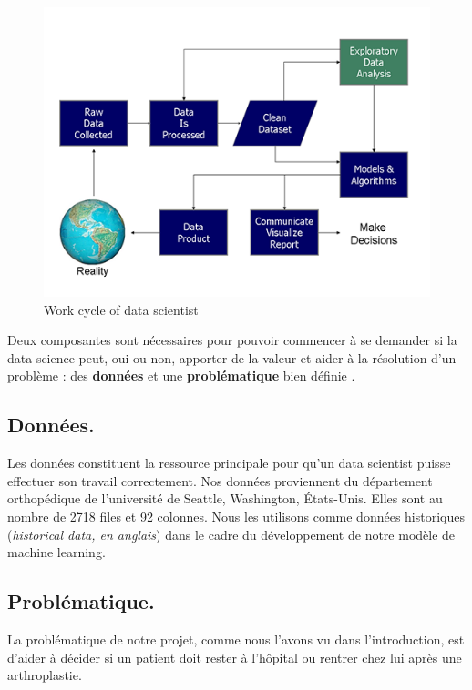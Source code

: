 \documentclass[12pt, french]{report}
\begin{document}
\begin{figure}[h]
\includegraphics[]{images/workflow_datascientis.png}
\caption{Work cycle of data scientist \cite{key6}}
\label{workflow_datascientis}
\end{figure}
Deux composantes sont nécessaires pour pouvoir commencer à se demander si la data science peut, oui ou non, apporter de la valeur et aider à la résolution d'un problème : des \textbf{données} et une \textbf{problématique} bien définie \cite{key6}.
\subsection{Données.}
 Les données constituent la ressource principale pour qu'un data scientist puisse effectuer son travail correctement. Nos données proviennent du département orthopédique de l'université de Seattle, Washington, États-Unis. Elles sont au nombre de 2718 files et 92 colonnes. Nous les utilisons comme données historiques (\textit{historical data, en anglais}) dans le cadre du développement de notre modèle de machine learning. 
\subsection{Problématique.}
La problématique de notre projet, comme nous l'avons vu dans l'introduction, est d'aider à décider si un patient doit rester à l'hôpital ou rentrer chez lui après une arthroplastie.  
\end{document}
